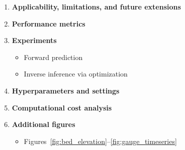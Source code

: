 \begin{enumerate}
    \item \textbf{Applicability, limitations, and future extensions}

    \item \textbf{Performance metrics}

    \item \textbf{Experiments}
    \begin{itemize}
        \item Forward prediction
        \item Inverse inference via optimization
    \end{itemize}

    \item \textbf{Hyperparameters and settings}

    \item \textbf{Computational cost analysis}

    \item \textbf{Additional figures}
    \begin{itemize}
        \item Figures~\ref{fig:bed_elevation}--\ref{fig:gauge_timeseries}
    \end{itemize}
\end{enumerate}